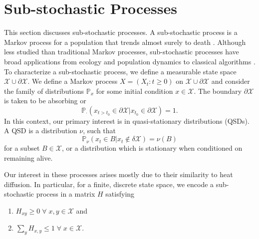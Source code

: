 \section{Sub-stochastic Processes}\label{sec:sub-stochastic}
	This section discusses sub-stochastic processes. A sub-stochastic process is a Markov process for a population that trends almost surely to death \cite{collet2012quasi,darroch1965quasi}. Although less studied than traditional Markov processes, sub-stochastic processes have broad applications from ecology and population dynamics to classical algorithms \cite{JJLO,meleard2012quasi}. 
	To characterize a sub-stochastic process, we define a measurable state space $\mathcal{X} \cup \partial \mathcal{X}$. We define a Markov process $X=(X_t:t\geq 0)$ on $\mathcal{X} \cup \partial\mathcal{X}$ and consider the family of distributions $\mathbb{P}_x$ for some initial condition $x \in \mathcal{X}$. The boundary $\partial \mathcal{X}$ is taken to be absorbing or 	
	\[
		\mathbb{P}_\cdot(x_{t > t_0} \in \partial \mathcal{X} \vert x_{t_0} \in \partial \mathcal{X}) = 1.
	\]
	In this context, our primary interest is in quasi-stationary distributions (QSDs). A QSD is a distribution $\nu$, such that
	\[
		\mathbb{P}_\nu ( x_{t} \in B \vert x_t \notin \delta \mathcal{X}) = \nu(B)
	\]	
	for a subset $B \in \mathcal{X}$, or a distribution which is stationary when conditioned on remaining alive. 

	Our interest  in these processes arises mostly due to their similarity to heat diffusion. In particular, for a finite, discrete state space, we encode a sub-stochastic process in a matrix $H$ satisfying
	\begin{enumerate}
		\item $H_{xy} \geq 0 \; \forall \; x,y \in \mathcal{X}$ and
		\item $\sum_{y} H_{x,y} \leq 1 \; \forall \; x \in \mathcal{X}$.
	\end{enumerate}
	
